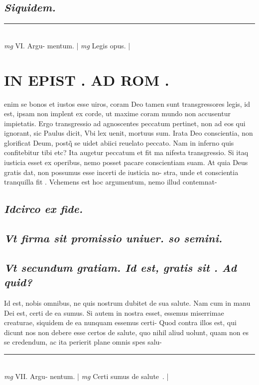 \documentclass{article}
\begin{document}
\begin{pages}
\subsection*{\textit{Siquidem. }}
\vspace{0.5cm}\noindent
\vspace{0.2cm}\rule{1cm}{0.2pt}\\ 
\hspace{0.2cm}\textit{mg}
\footnotesize VI. Argu- mentum. 
\normalsize| 
\hspace{0.2cm}\textit{mg}
\footnotesize Legis opus.  
\normalsize| 
\section*{IN EPIST . AD ROM .  }
\marginpar{[ p.42 ]}\pstart enim se bonos et iustos esse uiros, coram Deo tamen sunt transgressores legis, id est, ipsam non implent ex corde, ut maxime coram mundo non accusentur impietatis. Ergo transgressio ad agnoscentes peccatum pertinet, non ad eos qui ignorant, sic Paulus dicit, Vbi lex uenit, mortuus sum.  \pend\pstart Irata Deo conscientia, non glorificat Deum, postq̃ se uidet abiici reuelato peccato. Nam in inferno quis confitebitur tibi etc? Ita augetur peccatum et fit ma nifesta transgressio. Si itaq iusticia esset ex operibus, nemo posset pacare conscientiam suam. At quia Deus gratis dat, non possumus esse incerti de iusticia no- stra, unde et conscientia tranquilla fit . Vchemens est hoc argumentum, nemo illud contemnat-  \pend
{}
{}
\subsection*{\textit{Idcirco ex fide. }}
{}
\subsection*{\textit{Vt firma sit promissio uniuer. so semini. }}
{}
\subsection*{\textit{Vt secundum gratiam. Id est, gratis sit . Ad quid? }}\pstart Id est, nobis omnibus, ne quis nostrum dubitet de sua salute. Nam cum in manu Dei est, certi de ea sumus. Si autem in nostra esset, essemus miserrimae creaturae, siquidem de ea nunquam essemus certi- Quod contra illos est, qui dicunt nos non debere esse certos de salute, quo nihil aliud uolunt, quam non es se credendum, ac ita perierit plane omnis spes salu-  \pend
\vspace{0.5cm}\noindent
\vspace{0.2cm}\rule{1cm}{0.2pt}\\ 
\hspace{0.2cm}\textit{mg}
\footnotesize VII. Argu- nentum. 
\normalsize| 
\hspace{0.2cm}\textit{mg}
\footnotesize Certi sumus de salute .  
\normalsize| 

\end{pages}
\end{document}
